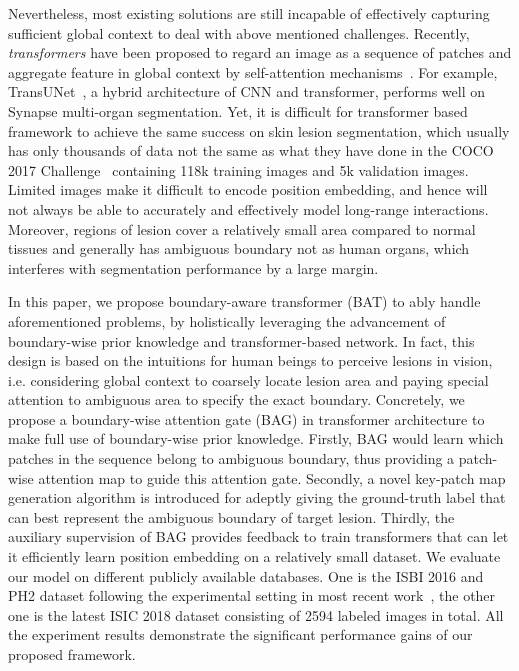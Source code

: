 \documentclass[runningheads]{paper478-llncs}
\begin{document}
Nevertheless, most existing solutions are still incapable of effectively capturing sufficient global context to deal with above mentioned challenges. 
Recently, \emph{transformers} have been proposed to regard an image as a sequence of patches and aggregate feature in global context by self-attention mechanisms~\cite{carion2020detr,prangemeier2020attention}. 
For example, TransUNet~\cite{chen2021transunet}, a hybrid architecture of CNN and transformer, performs well on Synapse multi-organ segmentation.
Yet, it is difficult for transformer based framework to achieve the same success on skin lesion segmentation, which usually has only thousands of data not the same as what they have done in the COCO 2017 Challenge~\cite {carion2020end} containing 118k training images and 5k validation images.
Limited images make it difficult to encode position embedding, and hence will not always be able to accurately and effectively model long-range interactions.
Moreover, regions of lesion cover a relatively small area compared to normal tissues and generally has ambiguous boundary not as human organs, which interferes with segmentation performance by a large margin.  


In this paper, we propose boundary-aware transformer (BAT) to ably handle aforementioned problems, by holistically leveraging the advancement of boundary-wise prior knowledge and transformer-based network. 
In fact, this design is based on the intuitions for human beings to perceive lesions in vision, i.e. considering global context to coarsely locate lesion area and paying special attention to ambiguous area to specify the exact boundary.
Concretely, we propose a boundary-wise attention gate (BAG) in transformer architecture to make full use of boundary-wise prior knowledge.
Firstly, BAG would learn which patches in the sequence belong to ambiguous boundary, thus providing a patch-wise attention map to guide this attention gate.
Secondly, a novel key-patch map generation algorithm is introduced for adeptly giving the ground-truth label that can best represent the ambiguous boundary of target lesion.
Thirdly, the auxiliary supervision of BAG provides feedback to train transformers that can let it efficiently learn position embedding on a relatively small dataset.  
We evaluate our model on different publicly available databases. One is the ISBI 2016 and PH2 dataset following the experimental setting in most recent work~\cite{9157193}, the other one is the latest 
ISIC 2018 dataset consisting of 2594 labeled images in total. All the experiment results demonstrate the significant performance gains of our proposed framework.
\end{document}
